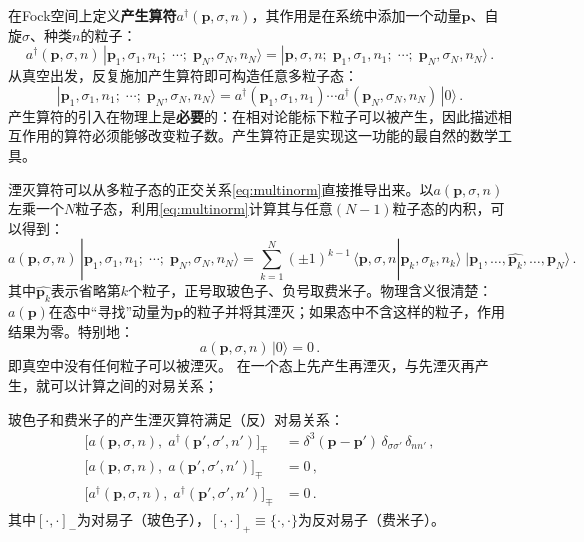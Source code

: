在Fock空间上定义\textbf{产生算符}$a^\dagger(\boldsymbol{p},\sigma,n)$，其作用是在系统中添加一个动量$\boldsymbol{p}$、自旋$\sigma$、种类$n$的粒子：
\begin{equation}\label{eq:creation-def}
a^\dagger(\boldsymbol{p},\sigma,n)\,|\boldsymbol{p}_1,\sigma_1,n_1;\;\cdots;\;\boldsymbol{p}_N,\sigma_N,n_N\rangle
= |\boldsymbol{p},\sigma,n;\;\boldsymbol{p}_1,\sigma_1,n_1;\;\cdots;\;\boldsymbol{p}_N,\sigma_N,n_N\rangle\,.
\end{equation}
从真空出发，反复施加产生算符即可构造任意多粒子态：
\begin{equation}
|\boldsymbol{p}_1,\sigma_1,n_1;\;\cdots;\;\boldsymbol{p}_N,\sigma_N,n_N\rangle
= a^\dagger(\boldsymbol{p}_1,\sigma_1,n_1)\cdots a^\dagger(\boldsymbol{p}_N,\sigma_N,n_N)\,|0\rangle\,.
\end{equation}
产生算符的引入在物理上是\textbf{必要}的：在相对论能标下粒子可以被产生，因此描述相互作用的算符必须能够改变粒子数。产生算符正是实现这一功能的最自然的数学工具。

\medskip

湮灭算符可以从多粒子态的正交关系\eqref{eq:multinorm}直接推导出来。以$a(\boldsymbol{p},\sigma,n)$左乘一个$N$粒子态，利用\eqref{eq:multinorm}计算其与任意$(N{-}1)$粒子态的内积，可以得到：
\begin{equation}\label{eq:annihilation-action}
a(\boldsymbol{p},\sigma,n)\,|\boldsymbol{p}_1,\sigma_1,n_1;\;\cdots;\;\boldsymbol{p}_N,\sigma_N,n_N\rangle
= \sum_{k=1}^{N} (\pm 1)^{k-1}\,
\langle\boldsymbol{p},\sigma,n|\boldsymbol{p}_k,\sigma_k,n_k\rangle\;
|\boldsymbol{p}_1,\ldots,\widehat{\boldsymbol{p}_k},\ldots,\boldsymbol{p}_N\rangle\,.
\end{equation}
其中$\widehat{\boldsymbol{p}_k}$表示省略第$k$个粒子，正号取玻色子、负号取费米子。物理含义很清楚：$a(\boldsymbol{p})$在态中``寻找''动量为$\boldsymbol{p}$的粒子并将其湮灭；如果态中不含这样的粒子，作用结果为零。特别地：
\begin{equation}
a(\boldsymbol{p},\sigma,n)\,|0\rangle = 0\,.
\end{equation}
即真空中没有任何粒子可以被湮灭。
\medskip
在一个态上先产生再湮灭，与先湮灭再产生，就可以计算之间的对易关系；
\begin{tcolorbox}[colback=white, colframe=black!70]
玻色子和费米子的产生湮灭算符满足（反）对易关系：
\begin{align}
    \bigl[a(\boldsymbol{p},\sigma,n),\; a^\dagger(\boldsymbol{p}',\sigma',n')\bigr]_\mp
    &= \delta^{3}(\boldsymbol{p}-\boldsymbol{p}')\,\delta_{\sigma\sigma'}\,\delta_{nn'}\,,
    \label{eq:comm-1}\\[4pt]
    \bigl[a(\boldsymbol{p},\sigma,n),\; a(\boldsymbol{p}',\sigma',n')\bigr]_\mp &= 0\,,
    \label{eq:comm-2}\\[4pt]
    \bigl[a^\dagger(\boldsymbol{p},\sigma,n),\; a^\dagger(\boldsymbol{p}',\sigma',n')\bigr]_\mp &= 0\,.
    \label{eq:comm-3}
\end{align}
其中$[\cdot,\cdot]_-$为对易子（玻色子），$[\cdot,\cdot]_+\equiv\{\cdot,\cdot\}$为反对易子（费米子）。
\end{tcolorbox}

